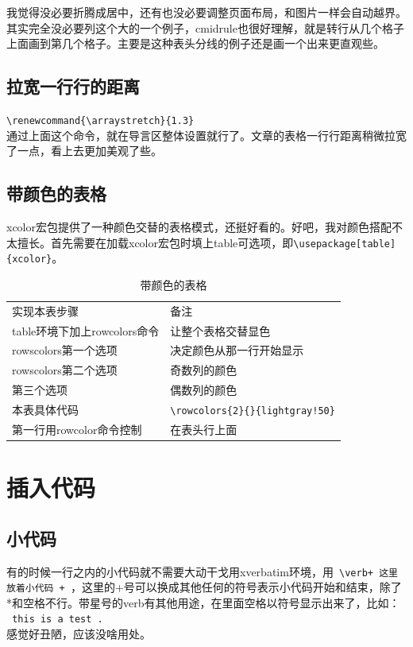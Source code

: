 \documentclass[11pt,oneside]{book}
\begin{document}
\begin{common-format}
我觉得没必要折腾成居中，还有也没必要调整页面布局，和图片一样会自动越界。其实完全没必要列这个大的一个例子，cmidrule也很好理解，就是转行从几个格子上面画到第几个格子。主要是这种表头分线的例子还是画一个出来更直观些。

\subsection{拉宽一行行的距离}
\verb+\renewcommand{\arraystretch}{1.3}+\\
通过上面这个命令，就在导言区整体设置就行了。文章的表格一行行距离稍微拉宽了一点，看上去更加美观了些。


\subsection[带颜色的表格]{带颜色的表格}
\label{sec:带颜色的表格}
xcolor宏包提供了一种颜色交替的表格模式，还挺好看的。好吧，我对颜色搭配不太擅长。首先需要在加载xcolor宏包时填上table可选项，即\verb+\usepackage[table]{xcolor}+。
\begin{table}[H]

\centering
\begin{tabular}{@{}ll@{}}
\rowcolor{lightgray!20}
实现本表步骤        &     备注         \\ 
table环境下加上rowcolors命令        & 让整个表格交替显色           \\
rowscolors第一个选项              & 决定颜色从那一行开始显示              \\
rowscolors第二个选项            & 奇数列的颜色  \\
第三个选项  & 偶数列的颜色 \\
本表具体代码    & {\small \verb+\rowcolors{2}{}{lightgray!50}+ }    \\
第一行用rowcolor命令控制       & 在表头行上面           
\end{tabular}
\caption{带颜色的表格}
\label{tab:带颜色的表格}

\end{table}


\section{插入代码}
\subsection{小代码}
有的时候一行之内的小代码就不需要大动干戈用xverbatim环境，用\verb| \verb+ 这里放着小代码 + |，这里的+号可以换成其他任何的符号表示小代码开始和结束，除了*和空格不行。带星号的verb有其他用途，在里面空格以符号显示出来了，比如：\\
\verb*| this is a test . | \\感觉好丑陋，应该没啥用处。


\end{common-format}
\end{document}
